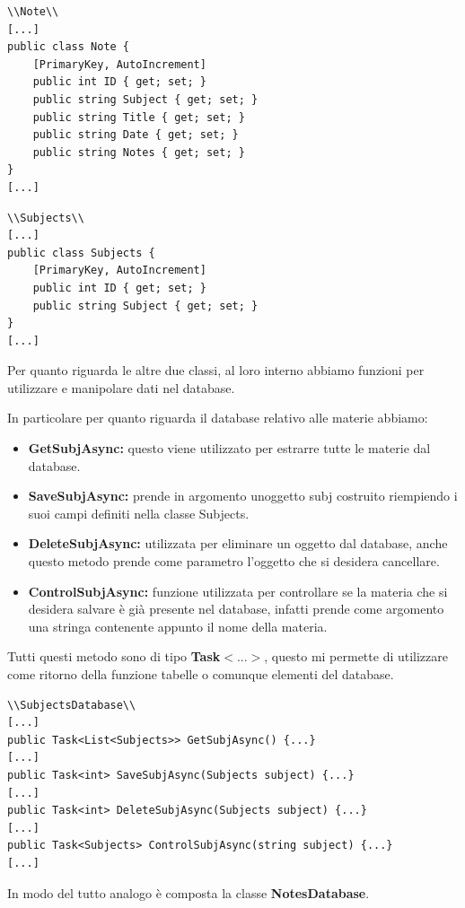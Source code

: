 \documentclass[a4paper, 50pt, twoside]{article}
\begin{document}
\begin{lstlisting}
\\Note\\
[...]
public class Note {
	[PrimaryKey, AutoIncrement]
	public int ID { get; set; }
	public string Subject { get; set; }
	public string Title { get; set; }
	public string Date { get; set; }
	public string Notes { get; set; }
}
[...]
\end{lstlisting}

\begin{lstlisting}
\\Subjects\\
[...]
public class Subjects {
	[PrimaryKey, AutoIncrement]
	public int ID { get; set; }
	public string Subject { get; set; }
}
[...]
\end{lstlisting}

Per quanto riguarda le altre due classi, al loro interno abbiamo funzioni per utilizzare e manipolare dati nel database.

In particolare per quanto riguarda il database relativo alle materie abbiamo:
\begin{itemize}
\item \textbf{GetSubjAsync:} questo viene utilizzato per estrarre tutte le materie dal database.
\item \textbf{SaveSubjAsync:} prende in argomento unoggetto subj costruito riempiendo i suoi campi definiti nella classe Subjects.
\item \textbf{DeleteSubjAsync:} utilizzata per eliminare un oggetto dal database, anche questo metodo prende come parametro l'oggetto che si desidera cancellare.
\item \textbf{ControlSubjAsync:} funzione utilizzata per controllare se la materia che si desidera salvare è già presente nel database, infatti prende come argomento una stringa contenente appunto il nome della materia.
\end{itemize}

Tutti questi metodo sono di tipo \textbf{Task$<...>$}, questo mi permette di utilizzare come ritorno della funzione tabelle o comunque elementi del database.

\begin{lstlisting}
\\SubjectsDatabase\\
[...]
public Task<List<Subjects>> GetSubjAsync() {...}
[...]
public Task<int> SaveSubjAsync(Subjects subject) {...}
[...]
public Task<int> DeleteSubjAsync(Subjects subject) {...}
[...]
public Task<Subjects> ControlSubjAsync(string subject) {...}
[...]
\end{lstlisting}

In modo del tutto analogo è composta la classe \textbf{NotesDatabase}.
\end{document}
